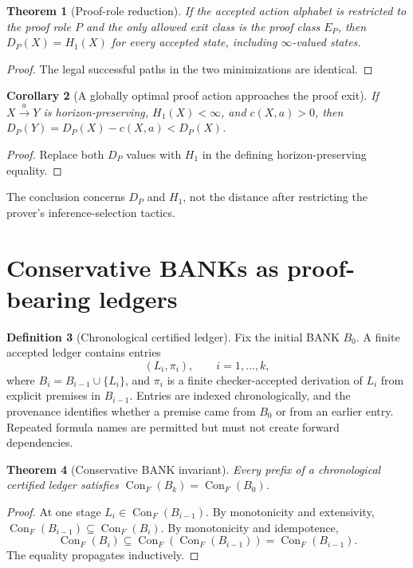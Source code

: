 \documentclass[11pt,letterpaper]{article}
\newtheorem{theorem}{Theorem}[section]
\newtheorem{corollary}[theorem]{Corollary}
\theoremstyle{definition}
\newtheorem{definition}[theorem]{Definition}
\theoremstyle{remark}
\newcommand{\Con}{\operatorname{Con}_{F}}
\newcommand{\Exit}{E_{P}}
\newcommand{\Hone}{H_{1}}
\begin{document}
\begin{theorem}[Proof-role reduction]\label{thm:B_role}
If the accepted action alphabet is restricted to the proof role $P$ and the only allowed exit class is the proof class $\Exit$, then $D_P(X)=\Hone(X)$ for every accepted state, including $\infty$-valued states.
\end{theorem}
\begin{proof}The legal successful paths in the two minimizations are identical.\end{proof}
\begin{corollary}[A globally optimal proof action approaches the proof exit]
If $X\xrightarrow{a}Y$ is horizon-preserving, $\Hone(X)<\infty$, and $c(X,a)>0$, then $D_P(Y)=D_P(X)-c(X,a)<D_P(X)$.
\end{corollary}
\begin{proof}Replace both $D_P$ values with $\Hone$ in the defining horizon-preserving equality.\end{proof}
The conclusion concerns $D_P$ and $\Hone$, not the distance after restricting the prover's inference-selection tactics.

\section{Conservative BANKs as proof-bearing ledgers}
\begin{definition}[Chronological certified ledger]
Fix the initial BANK $B_0$. A finite accepted ledger contains entries
\[
 (L_i,\pi_i),\qquad i=1,\ldots,k,
\]
where $B_i=B_{i-1}\cup\{L_i\}$, and $\pi_i$ is a finite checker-accepted derivation of $L_i$ from explicit premises in $B_{i-1}$. Entries are indexed chronologically, and the provenance identifies whether a premise came from $B_0$ or from an earlier entry. Repeated formula names are permitted but must not create forward dependencies.
\end{definition}

\begin{theorem}[Conservative BANK invariant]\label{thm:B_bank}
Every prefix of a chronological certified ledger satisfies $\Con(B_k)=\Con(B_0)$.
\end{theorem}
\begin{proof}
At one stage $L_i\in\Con(B_{i-1})$. By monotonicity and extensivity, $\Con(B_{i-1})\subseteq\Con(B_i)$. By monotonicity and idempotence,
\[
\Con(B_i)\subseteq\Con(\Con(B_{i-1}))=\Con(B_{i-1}).
\]
The equality propagates inductively.
\end{proof}
\end{document}
